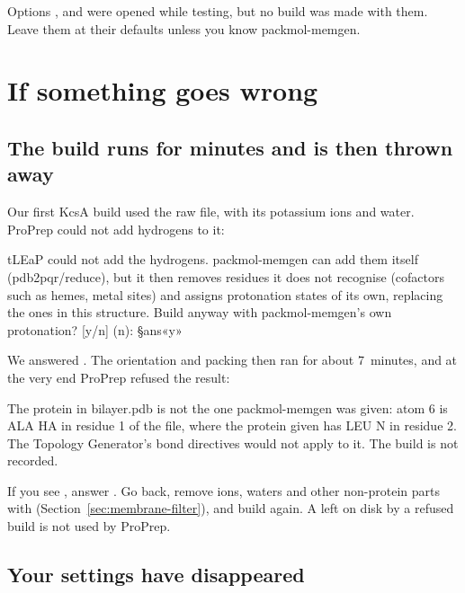 \medskip
Options ,  and  were opened while testing, but no build
was made with them. Leave them at their defaults unless you know packmol-memgen.

\section{If something goes wrong}
\label{sec:membrane-traps}

\subsection{The build runs for minutes and is then thrown away}

Our first KcsA build used the raw  file, with its potassium ions and
water. ProPrep could not add hydrogens to it:

\begin{screen}
tLEaP could not add the hydrogens. packmol-memgen can add them itself
(pdb2pqr/reduce), but it then removes residues it does not recognise
(cofactors such as hemes, metal sites) and assigns protonation states of its
own, replacing the ones in this structure.
Build anyway with packmol-memgen's own protonation? [y/n] (n): §ans«y»
\end{screen}

We answered . The orientation and packing then ran for about
7~minutes, and at the very end ProPrep refused the result:

\begin{screen}
The protein in bilayer.pdb is not the one packmol-memgen was given: atom 6 is
ALA HA in residue 1 of the file, where the protein given has LEU N in
residue 2. The Topology Generator's bond directives would not apply to it.
The build is not recorded.
\end{screen}

\begin{watchout}
If you see , answer . Go
back, remove ions, waters and other non-protein parts with 
(Section~\ref{sec:membrane-filter}), and build again. A  left
on disk by a refused build is not used by ProPrep.
\end{watchout}

\subsection{Your settings have disappeared}

